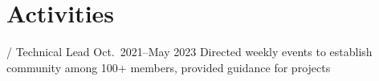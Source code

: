 \section{Activities}
\begin{outline}
     / Technical Lead
    \hfill Oct.\ 2021--May 2023
        \1 Directed weekly events to establish community among 100+ members, provided guidance for  projects
\end{outline}
